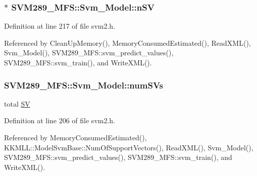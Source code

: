 \subsubsection[{\texorpdfstring{n\+SV}{nSV}}]{$\ast$ S\+V\+M289\+\_\+\+M\+F\+S\+::\+Svm\+\_\+\+Model\+::n\+SV}\hypertarget{struct_s_v_m289___m_f_s_1_1_svm___model_a99c49e2824661c212c1599dcd636d2c0}{}\label{struct_s_v_m289___m_f_s_1_1_svm___model_a99c49e2824661c212c1599dcd636d2c0}


Definition at line 217 of file svm2.\+h.



Referenced by Clean\+Up\+Memory(), Memory\+Consumed\+Estimated(), Read\+X\+M\+L(), Svm\+\_\+\+Model(), S\+V\+M289\+\_\+\+M\+F\+S\+::svm\+\_\+predict\+\_\+values(), S\+V\+M289\+\_\+\+M\+F\+S\+::svm\+\_\+train(), and Write\+X\+M\+L().

\subsubsection[{\texorpdfstring{num\+S\+Vs}{numSVs}}]{ S\+V\+M289\+\_\+\+M\+F\+S\+::\+Svm\+\_\+\+Model\+::num\+S\+Vs}\hypertarget{struct_s_v_m289___m_f_s_1_1_svm___model_a9d1cb317006096158440daf45c809f0c}{}\label{struct_s_v_m289___m_f_s_1_1_svm___model_a9d1cb317006096158440daf45c809f0c}
total \hyperlink{struct_s_v_m289___m_f_s_1_1_svm___model_ab2ebe759ca5aabb85fc6deea03706f0a}{SV} 

Definition at line 206 of file svm2.\+h.



Referenced by Memory\+Consumed\+Estimated(), K\+K\+M\+L\+L\+::\+Model\+Svm\+Base\+::\+Num\+Of\+Support\+Vectors(), Read\+X\+M\+L(), Svm\+\_\+\+Model(), S\+V\+M289\+\_\+\+M\+F\+S\+::svm\+\_\+predict\+\_\+values(), S\+V\+M289\+\_\+\+M\+F\+S\+::svm\+\_\+train(), and Write\+X\+M\+L().

